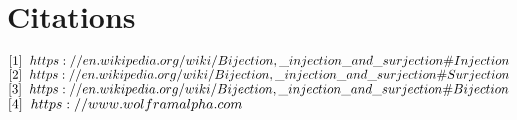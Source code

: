 \documentclass[11pt]{article}
\begin{document}
\newpage
\section*{Citations}
$
\lbrack 1 \rbrack \hspace{2mm}  https://en.wikipedia.org/wiki/Bijection,\_injection\_and\_surjection\#Injection
$
\\
$
\lbrack 2 \rbrack \hspace{2mm}  https://en.wikipedia.org/wiki/Bijection,\_injection\_and\_surjection\#Surjection
$
\\
$
\lbrack 3 \rbrack \hspace{2mm}  https://en.wikipedia.org/wiki/Bijection,\_injection\_and\_surjection\#Bijection
$
\\
$
\lbrack 4 \rbrack \hspace{2mm} https://www.wolframalpha.com
$
\end{document}
